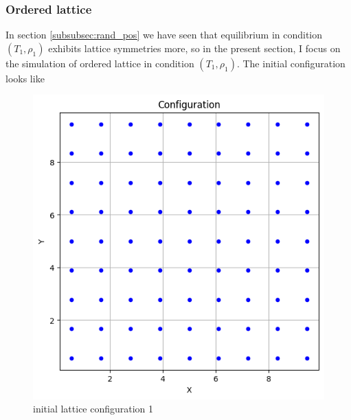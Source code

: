 \documentclass[letterpaper,12pt]{article}
\numberwithin{equation}{section}
\begin{document}
\subsubsection{Ordered lattice}
In section \ref{subsubsec:rand_pos} we have seen that equilibrium in condition $(T_1,\rho_1)$ exhibits lattice symmetries more, so in the present section, I focus on the simulation of ordered lattice in condition $(T_1,\rho_1)$. The initial configuration looks like
\begin{figure}[H]
    \centering
    \includegraphics{Project/init_config_lattice1.png}
    \caption{initial lattice configuration 1}
    \label{fig:init_config_lattice1}
\end{figure}
\end{document}
